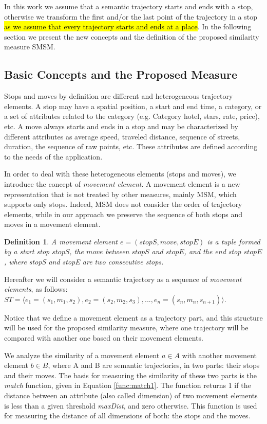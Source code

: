 \documentclass[12pt]{article}
\newtheorem{definition}{Definition}
\begin{document}
In this work we assume that a semantic trajectory starts and ends with a stop, otherwise we transform the first and/or the last point of the trajectory in a stop \hl{as we assume that every trajectory starts and ends at a place}. In the following section we present the new concepts and the definition of the proposed similarity measure SMSM.

\subsection{Basic Concepts and the Proposed Measure}

Stops and moves by definition are different and heterogeneous trajectory elements. A stop may have a spatial position, a start and end time, a category, or a set of attributes related to the category (e.g. Category hotel, stars, rate, price), etc. A move always starts and ends in a stop and may be characterized by different attributes as average speed, traveled distance, sequence of streets, duration, the sequence of raw points, etc. These attributes are defined according to the needs of the application. 

In order to deal with these heterogeneous elements (stops and moves), we introduce the concept of \emph{movement element}. A movement element is a new representation that is not treated by other measures, mainly MSM, which supports only stops. Indeed, MSM does not consider the order of trajectory elements, while in our approach we preserve the sequence of both stops and moves in a movement element.

\begin{definition}
\label{def:movement_element}
A movement element  $e=(stopS, move, stopE)$ is a tuple formed by a start stop $stopS$, the $move$ between $stopS$ and  $stopE$, and the end stop $stopE$, where stopS and stopE are two consecutive stops.
\end{definition}


Hereafter we will consider a semantic trajectory as a sequence of \textit{movement elements}, as follows: 
$ST=\langle e_1=(s_1,m_1,s_2), e_2=(s_2,m_2,s_3), ..., e_n=(s_n,m_n,s_{n+1}) \rangle$.

Notice that we define a movement element as a trajectory part, and this structure will be used for the proposed similarity measure, where one trajectory will be compared with another one based on their movement elements.



We analyze the similarity of a movement element $a\in A$ with another movement element $b\in B$, where A and B are semantic trajectories, in two parts: their stops and their moves. The basis for measuring the similarity of these two parts is the \emph{match} function, given in Equation \ref{func:match1}. The function returns 1 if the distance between an attribute (also called dimension) of two movement elements is less than a given threshold \emph{maxDist}, and zero otherwise. This function is used for measuring the distance of all dimensions of both: the stops and the moves.
\end{document}
